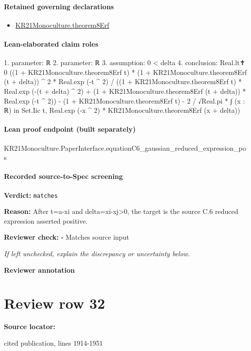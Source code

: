 \documentclass[10pt]{article}
\newcommand{\reviewerbox}{%
  \par\noindent\fbox{\parbox{0.96\linewidth}{\rule{0pt}{0.38in}}}\par
}
\newcommand{\reviewmatch}[1]{%
  \par\noindent\textbf{Reviewer check:} $\square$\; #1\par
  \noindent\emph{If left unchecked, explain the discrepancy or uncertainty below.}\par
}
\begin{document}
\paragraph{Retained governing declarations}
\begin{itemize}\raggedright
\item \hyperlink{paper-prerequisite-89a4972e4c2bbebd}{KR21\allowbreak{}Monoculture.\allowbreak{}theorem8\allowbreak{}Erf}
\end{itemize}
\paragraph{Lean-elaborated claim roles}\begin{ReviewVerbatim}
1. parameter: ℝ
2. parameter: ℝ
3. assumption: 0 < delta
4. conclusion: Real.lt✝ 0
  ((1 + KR21Monoculture.theorem8Erf t) * (1 + KR21Monoculture.theorem8Erf (t + delta)) ^ 2 * Real.exp (-t ^ 2) /
        ((1 + KR21Monoculture.theorem8Erf t) * Real.exp (-(t + delta) ^ 2) +
          (1 + KR21Monoculture.theorem8Erf (t + delta)) * Real.exp (-t ^ 2)) -
      (1 + KR21Monoculture.theorem8Erf t) -
    2 / √Real.pi * ∫ (x : ℝ) in Set.Iic t, Real.exp (-x ^ 2) * KR21Monoculture.theorem8Erf (x + delta))
\end{ReviewVerbatim}

\paragraph{Lean proof endpoint (built separately)}\begin{ReviewVerbatim}
KR21Monoculture.PaperInterface.equationC6_gaussian_reduced_expression_pos
\end{ReviewVerbatim}

\paragraph{Recorded source-to-Spec screening}
\textbf{Verdict:} \texttt{matches}
\\
{\raggedright
\textbf{Reason:} After t=a-\allowbreak{}xi and delta=xi-\allowbreak{}xj>0, the target is the source C.\allowbreak{}6 reduced expression asserted positive.\allowbreak{}
\par}
\reviewmatch{Matches source input}
\noindent\textbf{Reviewer annotation}\par
\reviewerbox
\clearpage
\hypertarget{source-claim-4d39c9a7a45156fa}{}
\section*{Review row 32}
\textbf{Source locator:} {\footnotesize\raggedright cited publication, lines 1914-\allowbreak{}1951\par}
\end{document}

